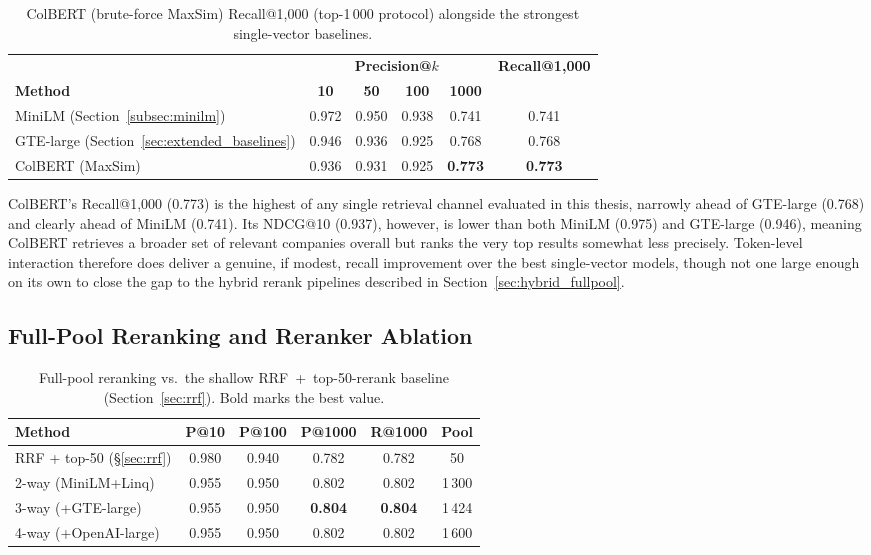 \documentclass[a4paper,oneside,bibliography=totoc]{scrbook}
\begin{document}
\label{sec:colbert_result}

\begin{table}[ht]
\centering
\caption{ColBERT (brute-force MaxSim) Recall@1{,}000 (top-1\,000
         protocol) alongside the strongest single-vector baselines.}
\label{tab:colbert}
\begin{tabular}{lccccc}
\toprule
& \multicolumn{4}{c}{\textbf{Precision@$k$}} & \textbf{Recall@1{,}000} \\
\cmidrule(lr){2-5}
\textbf{Method} & \textbf{10} & \textbf{50} & \textbf{100} & \textbf{1000} & \\
\midrule
MiniLM (Section~\ref{subsec:minilm})             & 0.972 & 0.950 & 0.938 & 0.741 & 0.741 \\
GTE-large (Section~\ref{sec:extended_baselines}) & 0.946 & 0.936 & 0.925 & 0.768 & 0.768 \\
ColBERT (MaxSim)                                 & 0.936 & 0.931 & 0.925 & \textbf{0.773} & \textbf{0.773} \\
\bottomrule
\end{tabular}
\end{table}

ColBERT's Recall@1{,}000 (0.773) is the highest of any single retrieval channel evaluated in this thesis, narrowly ahead of GTE-large (0.768) and clearly ahead of MiniLM (0.741). Its NDCG@10 (0.937), however, is lower than both MiniLM (0.975) and GTE-large (0.946), meaning ColBERT retrieves a broader set of relevant companies overall but ranks the very top results somewhat less precisely. Token-level interaction therefore does deliver a genuine, if modest, recall improvement over the best single-vector models, though not one large enough on its own to close the gap to the hybrid rerank pipelines described in Section~\ref{sec:hybrid_fullpool}.

\subsection{Full-Pool Reranking and Reranker Ablation}
\label{sec:hybrid_fullpool_result}

\begin{table}[ht]
\centering
\caption{Full-pool reranking vs.\ the shallow RRF~+~top-50-rerank baseline (Section~\ref{sec:rrf}). Bold marks the best value.}
\label{tab:hybrid_fullpool}
\small
\setlength{\tabcolsep}{2.5pt}
\begin{tabular}{lccccc}
\toprule
\textbf{Method} & \textbf{P@10} & \textbf{P@100} & \textbf{P@1000} & \textbf{R@1000} & \textbf{Pool} \\
\midrule
RRF + top-50 (\S\ref{sec:rrf})   & 0.980 & 0.940 & 0.782          & 0.782          & 50 \\
2-way (MiniLM+Linq)              & 0.955 & 0.950 & 0.802          & 0.802          & 1\,300 \\
3-way (+GTE-large)               & 0.955 & 0.950 & \textbf{0.804} & \textbf{0.804} & 1\,424 \\
4-way (+OpenAI-large)            & 0.955 & 0.950 & 0.802          & 0.802          & 1\,600 \\
\bottomrule
\end{tabular}
\normalsize
\end{table}
\end{document}
